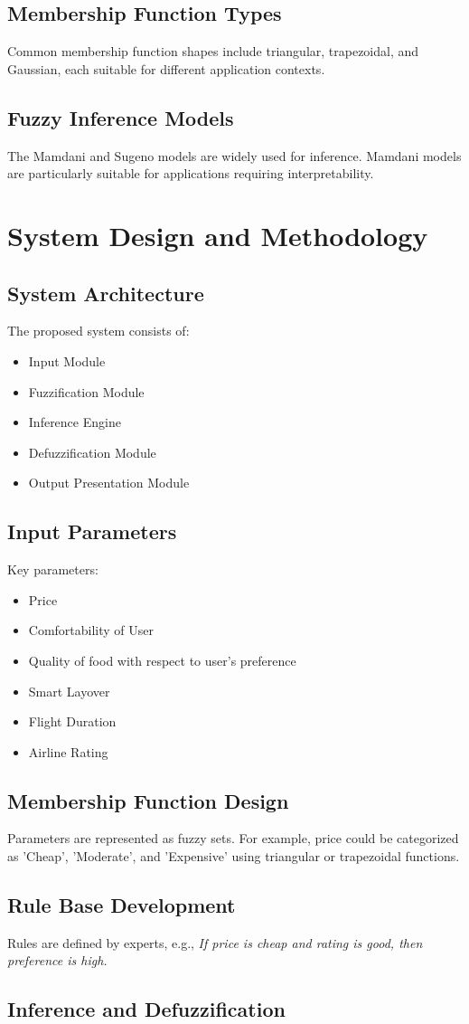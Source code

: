 \documentclass[a4paper]{article}
\begin{document}
\subsection{Membership Function Types}
Common membership function shapes include triangular, trapezoidal, and Gaussian, each suitable for different application contexts.

\subsection{Fuzzy Inference Models}
The Mamdani and Sugeno models are widely used for inference. Mamdani models are particularly suitable for applications requiring interpretability.

\section{System Design and Methodology}
\subsection{System Architecture}
The proposed system consists of:
\begin{itemize}
\item Input Module
\item Fuzzification Module
\item Inference Engine
\item Defuzzification Module
\item Output Presentation Module
\end{itemize}

\subsection{Input Parameters}
Key parameters:
\begin{itemize}
\item Price
\item Comfortability of User
\item Quality of food with respect to user's preference
\item Smart Layover
\item Flight Duration
\item Airline Rating
\end{itemize}

\subsection{Membership Function Design}
Parameters are represented as fuzzy sets. For example, price could be categorized as 'Cheap', 'Moderate', and 'Expensive' using triangular or trapezoidal functions.

\subsection{Rule Base Development}
Rules are defined by experts, e.g.,
\textit{If price is cheap and rating is good, then preference is high.}

\subsection{Inference and Defuzzification}






\end{document}
